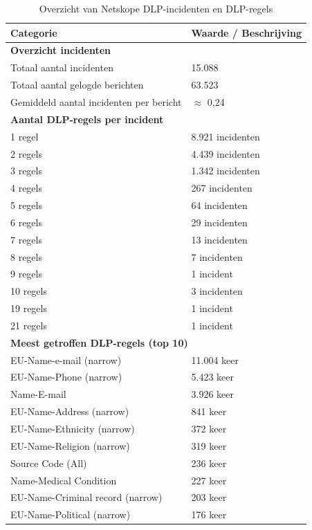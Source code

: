\begin{table}[H]
    \centering
    \small
    \scriptsize
    \begin{tabular}{ll}
        \toprule
        \textbf{Categorie} & \textbf{Waarde / Beschrijving} \\
        \midrule
        \multicolumn{2}{l}{\textbf{Overzicht incidenten}} \\
        Totaal aantal incidenten & 15.088 \\
        Totaal aantal gelogde berichten & 63.523 \\
        Gemiddeld aantal incidenten per bericht & $\approx$ 0,24 \\[4pt]

        \multicolumn{2}{l}{\textbf{Aantal DLP-regels per incident}} \\
        1 regel & 8.921 incidenten \\
        2 regels & 4.439 incidenten \\
        3 regels & 1.342 incidenten \\
        4 regels & 267 incidenten \\
        5 regels & 64 incidenten \\
        6 regels & 29 incidenten \\
        7 regels & 13 incidenten \\
        8 regels & 7 incidenten \\
        9 regels & 1 incident \\
        10 regels & 3 incidenten \\
        19 regels & 1 incident \\
        21 regels & 1 incident \\[4pt]

        \multicolumn{2}{l}{\textbf{Meest getroffen DLP-regels (top 10)}} \\
        EU-Name-e-mail (narrow) & 11.004 keer \\
        EU-Name-Phone (narrow) & 5.423 keer \\
        Name-E-mail & 3.926 keer \\
        EU-Name-Address (narrow) & 841 keer \\
        EU-Name-Ethnicity (narrow) & 372 keer \\
        EU-Name-Religion (narrow) & 319 keer \\
        Source Code (All) & 236 keer \\
        Name-Medical Condition & 227 keer \\
        EU-Name-Criminal record (narrow) & 203 keer \\
        EU-Name-Political (narrow) & 176 keer \\
        \bottomrule
    \end{tabular}
    \caption{Overzicht van Netskope DLP-incidenten en DLP-regels}
    \label{tab:netskope_dlp_resultaten}
\end{table}

